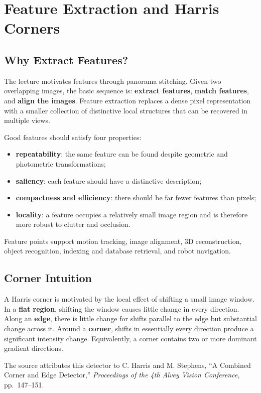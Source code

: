 \documentclass[11pt,a4paper,oneside]{report}
\begin{document}
\chapter{Feature Extraction and Harris Corners}

\section{Why Extract Features?}

The lecture motivates features through panorama stitching. Given two overlapping images, the basic sequence is: \textbf{extract features}, \textbf{match features}, and \textbf{align the images}. Feature extraction replaces a dense pixel representation with a smaller collection of distinctive local structures that can be recovered in multiple views.

Good features should satisfy four properties:
\begin{itemize}
  \item \textbf{repeatability}: the same feature can be found despite geometric and photometric transformations;
  \item \textbf{saliency}: each feature should have a distinctive description;
  \item \textbf{compactness and efficiency}: there should be far fewer features than pixels;
  \item \textbf{locality}: a feature occupies a relatively small image region and is therefore more robust to clutter and occlusion.
\end{itemize}

Feature points support motion tracking, image alignment, 3D reconstruction, object recognition, indexing and database retrieval, and robot navigation.

\section{Corner Intuition}

A Harris corner is motivated by the local effect of shifting a small image window. In a \textbf{flat region}, shifting the window causes little change in every direction. Along an \textbf{edge}, there is little change for shifts parallel to the edge but substantial change across it. Around a \textbf{corner}, shifts in essentially every direction produce a significant intensity change. Equivalently, a corner contains two or more dominant gradient directions.

The source attributes this detector to C. Harris and M. Stephens, ``A Combined Corner and Edge Detector,'' \emph{Proceedings of the 4th Alvey Vision Conference}, pp.~147--151.
\end{document}
